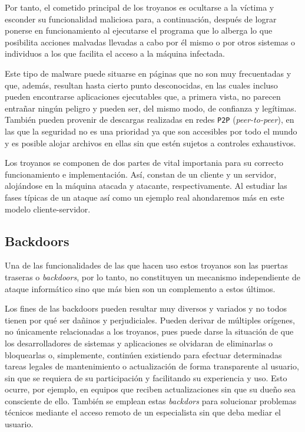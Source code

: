 \documentclass[12pt]{article}
\newcommand{\newpar} {
    \vskip 1cm
}
\begin{document}
            \newpar

            Por tanto, el cometido principal de los troyanos es ocultarse a la víctima y esconder su funcionalidad maliciosa para, a continuación, después de lograr ponerse en funcionamiento al ejecutarse el programa que lo alberga lo que posibilita acciones malvadas llevadas a cabo por él mismo o por otros sistemas o individuos a los que facilita el acceso a la máquina infectada.

            \newpar

            Este tipo de malware puede situarse en páginas que no son muy frecuentadas y que, además, resultan hasta cierto punto desconocidas, en las cuales incluso pueden encontrarse aplicaciones ejecutables que, a primera vista, no parecen entrañar ningún peligro y pueden ser, del mismo modo, de confianza y legítimas. También pueden provenir de descargas realizadas en redes \texttt{P2P} (\textit{peer-to-peer}), en las que la seguridad no es una prioridad ya que son accesibles por todo el mundo y es posible alojar archivos en ellas sin que estén sujetos a controles exhaustivos.

            \newpar

            Los troyanos se componen de dos partes de vital importania para su correcto funcionamiento e implementación. Así, constan de un cliente y un servidor, alojándose en la máquina atacada y atacante, respectivamente. Al estudiar las fases típicas de un ataque así como un ejemplo real ahondaremos más en este modelo cliente-servidor.

        \subsection{Backdoors}
            Una de las funcionalidades de las que hacen uso estos troyanos son las puertas traseras o \textit{backdoors}, por lo tanto, no constituyen un mecanismo independiente de ataque informático sino que más bien son un complemento a estos últimos.

            \newpar

            Los fines de las backdoors pueden resultar muy diversos y variados y no todos tienen por qué ser dañinos y perjudiciales. Pueden derivar de múltiples orígenes, no únicamente relacionadas a los troyanos, pues puede darse la situación de que los desarrolladores de sistemas y aplicaciones se olvidaran de eliminarlas o bloquearlas o, simplemente, continúen existiendo para efectuar determinadas tareas legales de mantenimiento o actualización de forma transparente al usuario, sin que se requiera de su participación y facilitando su experiencia y uso. Esto ocurre, por ejemplo, en equipos que reciben actualizaciones sin que su dueño sea consciente de ello. También se emplean estas \textit{backdors} para solucionar problemas técnicos mediante el acceso remoto de un especialista sin que deba mediar el usuario.
\end{document}
